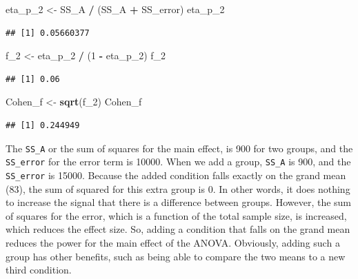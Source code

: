 \documentclass[
]{book}
\newenvironment{Shaded}{\begin{snugshade}}{\end{snugshade}}
\newcommand{\DecValTok}[1]{\textcolor[rgb]{0.00,0.00,0.81}{#1}}
\newcommand{\KeywordTok}[1]{\textcolor[rgb]{0.13,0.29,0.53}{\textbf{#1}}}
\newcommand{\NormalTok}[1]{#1}
\newcommand{\OperatorTok}[1]{\textcolor[rgb]{0.81,0.36,0.00}{\textbf{#1}}}
\newcommand{\StringTok}[1]{\textcolor[rgb]{0.31,0.60,0.02}{#1}}
\begin{document}
\begin{Shaded}
\begin{Highlighting}[]
\NormalTok{eta_p_}\DecValTok{2}\NormalTok{ <-}\StringTok{ }\NormalTok{SS_A }\OperatorTok{/}\StringTok{ }\NormalTok{(SS_A }\OperatorTok{+}\StringTok{ }\NormalTok{SS_error)}
\NormalTok{eta_p_}\DecValTok{2}
\end{Highlighting}
\end{Shaded}

\begin{verbatim}
## [1] 0.05660377
\end{verbatim}

\begin{Shaded}
\begin{Highlighting}[]
\NormalTok{f_}\DecValTok{2}\NormalTok{ <-}\StringTok{ }\NormalTok{eta_p_}\DecValTok{2} \OperatorTok{/}\StringTok{ }\NormalTok{(}\DecValTok{1} \OperatorTok{-}\StringTok{ }\NormalTok{eta_p_}\DecValTok{2}\NormalTok{)}
\NormalTok{f_}\DecValTok{2}
\end{Highlighting}
\end{Shaded}

\begin{verbatim}
## [1] 0.06
\end{verbatim}

\begin{Shaded}
\begin{Highlighting}[]
\NormalTok{Cohen_f <-}\StringTok{ }\KeywordTok{sqrt}\NormalTok{(f_}\DecValTok{2}\NormalTok{)}
\NormalTok{Cohen_f}
\end{Highlighting}
\end{Shaded}

\begin{verbatim}
## [1] 0.244949
\end{verbatim}

The \texttt{SS\_A} or the sum of squares for the main effect, is 900 for two groups, and the \texttt{SS\_error} for the error term is 10000. When we add a group, \texttt{SS\_A} is 900, and the \texttt{SS\_error} is 15000. Because the added condition falls exactly on the grand mean (83), the sum of squared for this extra group is 0. In other words, it does nothing to increase the signal that there is a difference between groups. However, the sum of squares for the error, which is a function of the total sample size, is increased, which reduces the effect size. So, adding a condition that falls on the grand mean reduces the power for the main effect of the ANOVA. Obviously, adding such a group has other benefits, such as being able to compare the two means to a new third condition.
\end{document}
